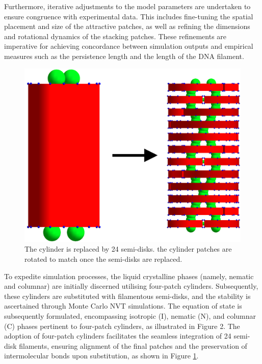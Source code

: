 \documentclass[aip,jcp, amsmath, amssymb, reprint]{revtex4-1}
\begin{document}
Furthermore, iterative adjustments to the model parameters are undertaken to ensure congruence with experimental data. This includes fine-tuning the spatial placement and size of the attractive patches, as well as refining the dimensions and rotational dynamics of the stacking patches. These refinements are imperative for achieving concordance between simulation outputs and empirical measures such as the persistence length and the length of the DNA filament. 

\begin{figure}[h!]
\includegraphics[width=0.7\linewidth]{sosti4.png}
\caption{\label{fig:fila} The cylinder is replaced by 24 semi-disks. the cylinder patches are rotated to match once the semi-disks are replaced.}
\end{figure}

To expedite simulation processes, the liquid crystalline phases (namely, nematic and columnar) are initially discerned utilising four-patch cylinders. Subsequently, these cylinders are substituted with filamentous semi-disks, and the stability is ascertained through Monte Carlo NVT simulations. The equation of state is subsequently formulated, encompassing isotropic (I), nematic (N), and columnar (C) phases pertinent to four-patch cylinders, as illustrated in Figure 2. The adoption of four-patch cylinders facilitates the seamless integration of 24 semi-disk filaments, ensuring alignment of the final patches and the preservation of intermolecular bonds upon substitution, as shown in Figure \ref{fig:fila}.
\end{document}
